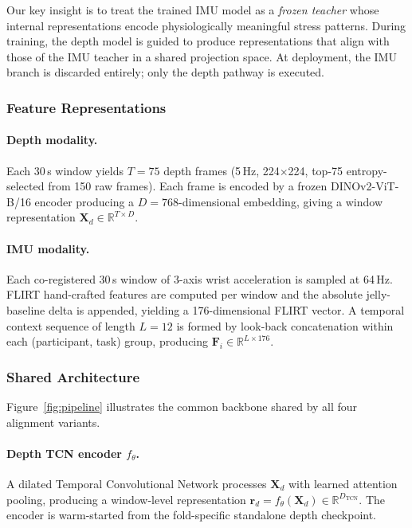 \documentclass[sigconf,anonymous=false]{acmart}
\begin{document}
Our key insight is to treat the trained IMU model as a \emph{frozen teacher}
whose internal representations encode physiologically meaningful stress
patterns.  During training, the depth model is guided to produce
representations that align with those of the IMU teacher in a shared
projection space.  At deployment, the IMU branch is discarded entirely;
only the depth pathway is executed.

\subsubsection{Feature Representations}

\paragraph{Depth modality.}
Each 30\,s window yields $T=75$ depth frames (5\,Hz, 224$\times$224, top-75
entropy-selected from 150 raw frames).  Each frame is encoded by a frozen
DINOv2-ViT-B/16 encoder producing a $D=768$-dimensional embedding, giving a
window representation $\mathbf{X}_d \in \mathbb{R}^{T \times D}$.

\paragraph{IMU modality.}
Each co-registered 30\,s window of 3-axis wrist acceleration is sampled at
64\,Hz.  FLIRT hand-crafted features are computed per window and the
absolute jelly-baseline delta is appended, yielding a 176-dimensional FLIRT
vector.  A temporal context sequence of length $L=12$ is formed by look-back
concatenation within each (participant, task) group, producing
$\mathbf{F}_i \in \mathbb{R}^{L \times 176}$.

\subsubsection{Shared Architecture}

Figure~\ref{fig:pipeline} illustrates the common backbone shared by all
four alignment variants.

\paragraph{Depth TCN encoder $f_\theta$.}
A dilated Temporal Convolutional Network processes $\mathbf{X}_d$ with
learned attention pooling, producing a window-level representation
$\mathbf{r}_d = f_\theta(\mathbf{X}_d) \in \mathbb{R}^{D_\text{TCN}}$.
The encoder is warm-started from the fold-specific standalone depth checkpoint.
\end{document}
